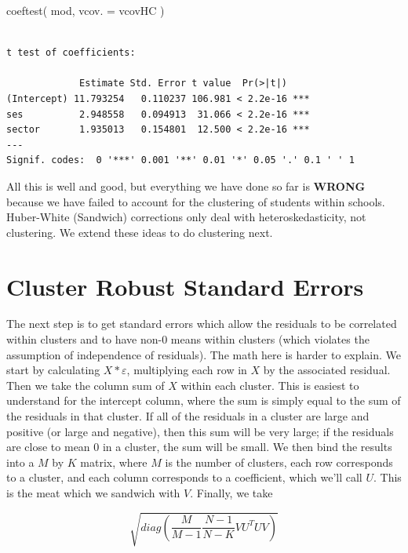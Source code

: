 \documentclass[
  letterpaper,
  DIV=11,
  numbers=noendperiod]{scrreprt}
\newenvironment{Shaded}{\begin{snugshade}}{\end{snugshade}}
\newcommand{\AttributeTok}[1]{\textcolor[rgb]{0.49,0.56,0.16}{#1}}
\newcommand{\FunctionTok}[1]{\textcolor[rgb]{0.02,0.16,0.49}{#1}}
\newcommand{\NormalTok}[1]{\textcolor[rgb]{0.00,0.44,0.13}{#1}}
\begin{document}
\begin{Shaded}
\begin{Highlighting}[]
\FunctionTok{coeftest}\NormalTok{( mod, }\AttributeTok{vcov. =}\NormalTok{ vcovHC )}
\end{Highlighting}
\end{Shaded}

\begin{verbatim}

t test of coefficients:

             Estimate Std. Error t value  Pr(>|t|)    
(Intercept) 11.793254   0.110237 106.981 < 2.2e-16 ***
ses          2.948558   0.094913  31.066 < 2.2e-16 ***
sector       1.935013   0.154801  12.500 < 2.2e-16 ***
---
Signif. codes:  0 '***' 0.001 '**' 0.01 '*' 0.05 '.' 0.1 ' ' 1
\end{verbatim}

All this is well and good, but everything we have done so far is
\textbf{WRONG} because we have failed to account for the clustering of
students within schools. Huber-White (Sandwich) corrections only deal
with heteroskedasticity, not clustering. We extend these ideas to do
clustering next.

\hypertarget{cluster-robust-standard-errors}{%
\section{Cluster Robust Standard
Errors}\label{cluster-robust-standard-errors}}

The next step is to get standard errors which allow the residuals to be
correlated within clusters and to have non-0 means within clusters
(which violates the assumption of independence of residuals). The math
here is harder to explain. We start by calculating \(X*\varepsilon\),
multiplying each row in \(X\) by the associated residual. Then we take
the column sum of \(X\) within each cluster. This is easiest to
understand for the intercept column, where the sum is simply equal to
the sum of the residuals in that cluster. If all of the residuals in a
cluster are large and positive (or large and negative), then this sum
will be very large; if the residuals are close to mean 0 in a cluster,
the sum will be small. We then bind the results into a \(M\) by \(K\)
matrix, where \(M\) is the number of clusters, each row corresponds to a
cluster, and each column corresponds to a coefficient, which we'll call
\(U\). This is the meat which we sandwich with \(V\). Finally, we take

\[\sqrt{ diag( \frac{M}{M-1}\frac{N-1}{N-K} VU^TUV)}\]
\end{document}
